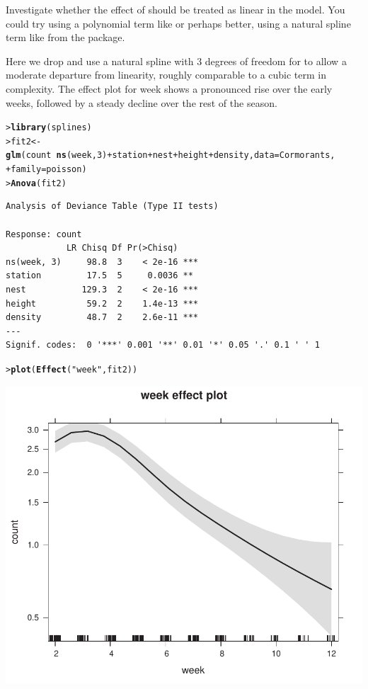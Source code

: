 \documentclass[10pt]{report}\usepackage[]{graphicx}\usepackage[]{color}
\makeatletter
\newcommand{\hlnum}[1]{\textcolor[rgb]{0.686,0.059,0.569}{#1}}%
\newcommand{\hlstr}[1]{\textcolor[rgb]{0.192,0.494,0.8}{#1}}%
\newcommand{\hlopt}[1]{\textcolor[rgb]{0,0,0}{#1}}%
\newcommand{\hlstd}[1]{\textcolor[rgb]{0.345,0.345,0.345}{#1}}%
\newcommand{\hlkwb}[1]{\textcolor[rgb]{0.69,0.353,0.396}{#1}}%
\newcommand{\hlkwc}[1]{\textcolor[rgb]{0.333,0.667,0.333}{#1}}%
\newcommand{\hlkwd}[1]{\textcolor[rgb]{0.737,0.353,0.396}{\textbf{#1}}}%
\newenvironment{kframe}{%
 \def\at@end@of@kframe{}%
 \ifinner\ifhmode%
  \def\at@end@of@kframe{\end{minipage}}%
  \begin{minipage}{\columnwidth}%
 \fi\fi%
 \def\FrameCommand##1{\hskip\@totalleftmargin \hskip-\fboxsep
 \colorbox{shadecolor}{##1}\hskip-\fboxsep
     \hskip-\linewidth \hskip-\@totalleftmargin \hskip\columnwidth}%
 \MakeFramed {\advance\hsize-\width
   \@totalleftmargin\z@ \linewidth\hsize
   \@setminipage}}%
 {\par\unskip\endMakeFramed%
 \at@end@of@kframe}
\newenvironment{knitrout}{}{} %
\renewenvironment{knitrout}{\small\renewcommand{\baselinestretch}{.85}}{} %
\makeatother
\begin{document}
\begin{Exercises}
\begin{enumerate*}
		\item Investigate whether the effect of  should be treated as linear in the
		model.  You could try using a polynomial term like  or
		perhaps better, using a natural spline term like  from the  package.
		\begin{ans}
		Here we drop  and
		use a natural spline with 3 degrees of freedom for  to allow a moderate departure from linearity,
		roughly comparable to a cubic term  in complexity.
		The effect plot for week shows a pronounced rise over the early weeks, followed by a steady decline over
		the rest of the season.
\begin{knitrout}\footnotesize
{}\color{fgcolor}\begin{kframe}
\begin{alltt}
\hlstd{> }\hlkwd{library}\hlstd{(splines)}
\hlstd{> }\hlstd{fit2} \hlkwb{<-}\hlkwd{glm}\hlstd{(count} \hlopt{~} \hlkwd{ns}\hlstd{(week,}\hlnum{3}\hlstd{)} \hlopt{+} \hlstd{station} \hlopt{+} \hlstd{nest} \hlopt{+} \hlstd{height} \hlopt{+} \hlstd{density ,} \hlkwc{data}\hlstd{=Cormorants,}
\hlstd{+ }    \hlkwc{family} \hlstd{= poisson)}
\hlstd{> }\hlkwd{Anova}\hlstd{(fit2)}
\end{alltt}
\begin{verbatim}
Analysis of Deviance Table (Type II tests)

Response: count
            LR Chisq Df Pr(>Chisq)    
ns(week, 3)     98.8  3    < 2e-16 ***
station         17.5  5     0.0036 ** 
nest           129.3  2    < 2e-16 ***
height          59.2  2    1.4e-13 ***
density         48.7  2    2.6e-11 ***
---
Signif. codes:  0 '***' 0.001 '**' 0.01 '*' 0.05 '.' 0.1 ' ' 1
\end{verbatim}
\begin{alltt}
\hlstd{> }\hlkwd{plot}\hlstd{(}\hlkwd{Effect}\hlstd{(}\hlstr{"week"}\hlstd{, fit2))}
\end{alltt}
\end{kframe}

\centerline{\includegraphics[width=.5\textwidth]{soln/fig/ex11_4d-1} }




\end{knitrout}
\end{ans}
\end{enumerate*}
\end{Exercises}
\end{document}
